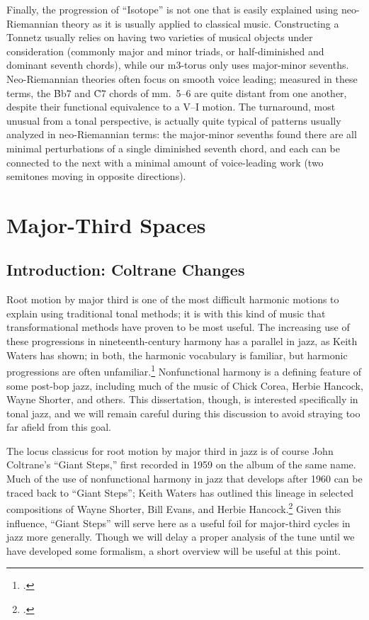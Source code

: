 Finally, the progression of ``Isotope'' is not one that is easily explained
using neo-Riemannian theory as it is usually applied to classical music.
Constructing a Tonnetz usually relies on having two varieties of musical objects
under consideration (commonly major and minor triads, or half-diminished and
dominant seventh chords), while our m3-torus only uses major-minor sevenths.
Neo-Riemannian theories often focus on smooth voice leading; measured in these
terms, the \h{Bb7} and \h{C7} chords of mm.~5--6 are quite distant from one
another, despite their functional equivalence to a V--I motion. The
turnaround, most unusual from a tonal perspective, is actually quite typical
of patterns usually analyzed in neo-Riemannian terms: the major-minor sevenths
found there are all minimal perturbations of a single diminished seventh
chord, and each can be connected to the next with a minimal amount of
voice-leading work (two semitones moving in opposite directions).

\section{Major-Third Spaces}
\label{sec:maj3-spaces}

\subsection{Introduction: Coltrane Changes}
\label{subsec:maj3-intro}

Root motion by major third is one of the most difficult harmonic motions to
explain using traditional tonal methods; it is with this kind of music that
transformational methods have proven to be most useful. The
increasing use of these progressions in nineteenth-century harmony has a
parallel in jazz, as Keith Waters has shown; in both, the harmonic vocabulary
is familiar, but harmonic progressions are often
unfamiliar.\footcite{waters:2013} Nonfunctional harmony is a defining
feature of some post-bop jazz, including much of the music of Chick Corea,
Herbie Hancock, Wayne Shorter, and others. This dissertation,
though, is interested specifically in tonal jazz, and we will remain careful
during this discussion to avoid straying too far afield from this goal.

The locus classicus for root motion by major third in jazz is of course John
Coltrane's ``Giant Steps,'' first recorded in 1959 on the album of the same
name. Much of the use of nonfunctional harmony in jazz that
develops after 1960 can be traced back to ``Giant Steps''; Keith Waters has
outlined this lineage in selected compositions of Wayne Shorter, Bill Evans,
and Herbie Hancock.\footcite{waters:2010} Given this influence, ``Giant
Steps'' will serve here as a useful foil for major-third cycles in jazz more
generally. Though we will delay a proper analysis of the tune until we have
developed some formalism, a short overview will be useful at this point.

